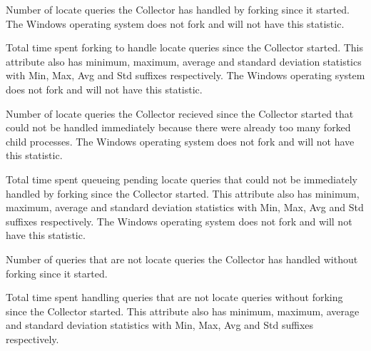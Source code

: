 \begin{description}
\item[\AdAttr{HandleLocateForked}:] Number of locate queries the Collector has handled by forking since it started.
The Windows operating system does not fork and will not have this statistic.

\item[\AdAttr{HandleLocateForkedRuntime}:] Total time spent forking to handle locate queries since the Collector started.
This attribute also has minimum, maximum, average and standard deviation statistics with Min, Max, Avg and Std suffixes respectively.
The Windows operating system does not fork and will not have this statistic.

\item[\AdAttr{HandleLocateMissedFork}:] Number of locate queries the Collector 
recieved since the Collector started that could not be handled immediately because there were already too many forked child processes.
The Windows operating system does not fork and will not have this statistic.

\item[\AdAttr{HandleLocateMissedForkRuntime}:] Total time spent queueing pending locate queries that could not be immediately handled by forking since the Collector started.
This attribute also has minimum, maximum, average and standard deviation statistics with Min, Max, Avg and Std suffixes respectively.
The Windows operating system does not fork and will not have this statistic.

\item[\AdAttr{HandleQuery}:] Number of queries that are not locate queries the Collector has handled without forking since it started.

\item[\AdAttr{HandleQueryRuntime}:] Total time spent handling queries that are not locate queries without forking since the Collector started.
This attribute also has minimum, maximum, average and standard deviation statistics with Min, Max, Avg and Std suffixes respectively.


\end{description}
